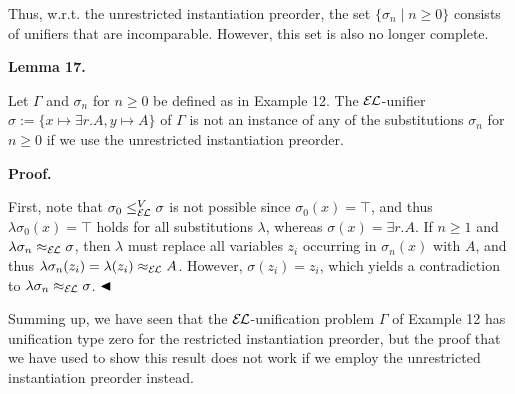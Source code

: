 
 
Thus, w.r.t. the unrestricted instantiation preorder, the set $\{\sigma_{n}\mid n\geq 0\}$ consists of unifiers that are incomparable. However, this set is also no longer complete.\par
 
 
 
\par\medskip\noindent\textbf{Lemma 17.}\par
 
 
Let $\Gamma$ and $\sigma_{n}$ for $n\geq 0$ be defined as in Example 12. The $\mathcal{E\mkern-1.618muL}$-unifier $\sigma:=\{x\mapsto\exists r.A,y\mapsto A\}$ of $\Gamma$ is not an instance of any of the substitutions $\sigma_{n}$ for $n\geq 0$ if we use the unrestricted instantiation preorder.\par
 
 
 
 
 
\par\medskip\noindent\textbf{Proof.}\par
 
 
First, note that $\sigma_{0}\leq_{\mathcal{E\mkern-1.618muL}}^{V}\sigma$ is not possible since $\sigma_{0}(x)=\top$, and thus $\lambda\sigma_{0}(x)=\top$ holds for all substitutions $\lambda$, whereas $\sigma(x)=\exists r.A$. If $n\geq 1$ and $\lambda\sigma_{n}\approx_{\mathcal{E\mkern-1.618muL}}\sigma$, then $\lambda$ must replace all variables $z_{i}$ occurring in $\sigma_{n}(x)$ with $A$, and thus $\lambda\sigma_{n}(z_{i})=\lambda(z_{i})\approx_{\mathcal{E\mkern-1.618muL}}A$. However, $\sigma(z_{i})=z_{i}$, which yields a contradiction to $\lambda\sigma_{n}\approx_{\mathcal{E\mkern-1.618muL}}\sigma$. $\hfill\blacktriangleleft$\par
 
 
 
Summing up, we have seen that the $\mathcal{E\mkern-1.618muL}$-unification problem $\Gamma$ of Example 12 has unification type zero for the restricted instantiation preorder, but the proof that we have used to show this result does not work if we employ the unrestricted instantiation preorder instead.\par
 
